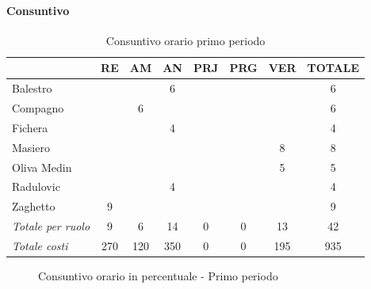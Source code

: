 \documentclass[a4paper,12pt]{article}
\begin{document}
            \paragraph{Consuntivo}
                \begin{table}[H]
                \centering
                \begin{tabular}{|l|c|c|c|c|c|c|c|}
                \hline
                    \rowcolor{lightgray}{\textbf{Membro}} & {\textbf{RE}} & {\textbf{AM}} & {\textbf{AN}} & {\textbf{PRJ}} & {\textbf{PRG}} & {\textbf{VER}} & {\textbf{TOTALE}}\\
                \hline
                    Balestro & & & 6 & & & & 6\\
                \hline
                    Compagno & & 6 & & & & & 6\\
                \hline
                    Fichera & & & 4 & & & & 4\\
                \hline
                    Masiero & & & & & & 8 & 8\\
                \hline
                    Oliva Medin & & & & & & 5 & 5\\
                \hline
                    Radulovic & & & 4 & & & & 4\\
                \hline
                    Zaghetto & 9 & & & & & & 9\\
                \hline
                    \rowcolor{lightgray}\textit{Totale per ruolo} & 9 & 6 & 14 & 0 & 0 & 13 & 42\\
                \hline
                    \rowcolor{lightgray}\textit{Totale costi} & 270 & 120 & 350 & 0 & 0 & 195 & 935\\
                \hline
                \end{tabular}
                \caption{Consuntivo orario primo periodo}
                \end{table}

                \begin{figure}[H]
                \centering
                \caption{Consuntivo orario in percentuale - Primo periodo}
                \end{figure}
                
\end{document}
